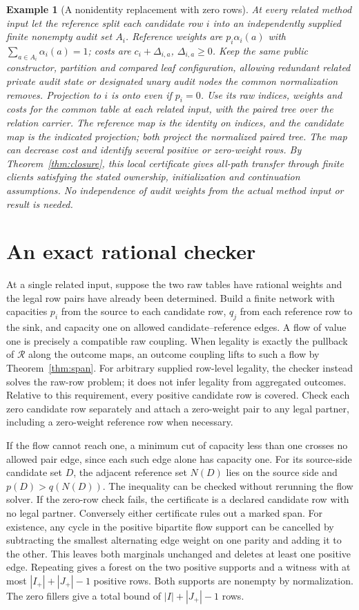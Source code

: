 \documentclass[11pt]{article}
\newtheorem{example}[theorem]{Example}
\theoremstyle{definition}
\newcommand{\R}{\mathcal R}
\begin{document}
\begin{example}[A nonidentity replacement with zero rows]
At every related method input let the reference split each candidate row
$i$ into an independently supplied finite nonempty audit set $A_i$.
Reference weights are $p_i\alpha_i(a)$ with $\sum_{a\in A_i}\alpha_i(a)=1$;
costs are $c_i+\Delta_{i,a}$, $\Delta_{i,a}\geq0$. Keep the same public
constructor, partition and compared leaf configuration, allowing redundant
related private audit state or designated unary audit nodes the common
normalization removes. Projection to $i$ is onto even if $p_i=0$.
Use its raw indices, weights and costs for the common table at each
related input, with the paired tree over the relation carrier. The
reference map is the identity on indices, and the candidate map is the
indicated projection; both project the normalized paired tree. The map
can decrease cost and identify several positive or zero-weight rows.
By Theorem~\ref{thm:closure}, this local certificate gives all-path
transfer through finite clients satisfying the stated ownership,
initialization and continuation assumptions. No independence of audit
weights from the actual method input or result is needed.
\end{example}

\section{An exact rational checker}
At a single related input, suppose the two raw tables have rational
weights and the legal row pairs have already been determined. Build a
finite network with capacities $p_i$ from the source to each candidate
row, $q_j$ from each reference row to the sink, and capacity one on
allowed candidate--reference edges. A flow of value one is precisely a
compatible raw coupling. When legality is exactly the pullback of $\R$ along the outcome maps,
an outcome coupling lifts to such a flow by Theorem~\ref{thm:span}. For
arbitrary supplied row-level legality, the checker instead solves the
raw-row problem; it does not infer legality from aggregated outcomes. Relative to this requirement, every
positive candidate row is covered. Check each zero candidate row
separately and attach a zero-weight pair to any legal partner, including
a zero-weight reference row when necessary.

If the flow cannot reach one, a minimum cut of capacity less than one
crosses no allowed pair edge, since each such edge alone has capacity
one. For its source-side candidate set $D$, the adjacent reference set
$N(D)$ lies on the source side and $p(D)>q(N(D))$. The inequality
can be checked without rerunning the flow solver. If the zero-row check
fails, the certificate is a declared candidate row with no legal
partner. Conversely either certificate rules out a marked span. For
existence, any cycle in the positive bipartite flow support can be
cancelled by subtracting the smallest alternating edge weight on one
parity and adding it to the other. This leaves both marginals unchanged
and deletes at least one positive edge. Repeating gives a forest on
the two positive supports and a witness with at most
$|I_+|+|J_+|-1$ positive rows. Both supports are nonempty by normalization.
The zero fillers give a total bound of $|I|+|J_+|-1$ rows.
\end{document}
